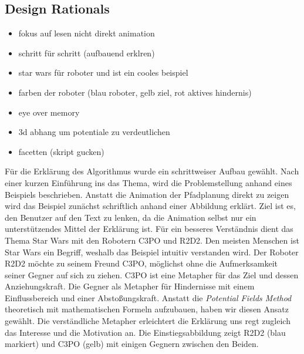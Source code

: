 \subsection{Design Rationals}
\begin{itemize}
\item fokus auf lesen nicht direkt animation
\item schritt für schritt (aufbauend erklren)
\item star wars für roboter und ist ein cooles beispiel
\item farben der roboter (blau roboter, gelb ziel, rot aktives hindernis)
\item eye over memory
\item 3d abhang um potentiale zu verdeutlichen
\item facetten (skript gucken)
\end{itemize}
Für die Erklärung des Algorithmus wurde ein schrittweiser Aufbau gewählt. Nach einer kurzen Einführung ins das Thema, wird die Problemstellung anhand eines Beispiels beschrieben. Anstatt die Animation der Pfadplanung direkt zu zeigen wird das Beispiel zunächst schriftlich anhand einer Abbildung erklärt. Ziel ist es, den Benutzer auf den Text zu lenken, da die Animation selbst nur ein unterstützendes Mittel der Erklärung ist.
Für ein besseres Verständnis dient das Thema Star Wars mit den Robotern C3PO und R2D2. Den meisten Menschen ist Star Wars ein Begriff, weshalb das Beispiel intuitiv verstanden wird. Der Roboter R2D2 möchte zu seinem Freund C3PO, möglichst ohne die Aufmerksamkeit seiner Gegner auf sich zu ziehen.
C3PO ist eine Metapher für das Ziel und dessen Anziehungskraft. Die Gegner als Metapher für Hindernisse mit einem Einflussbereich und einer Abstoßungskraft.
Anstatt die \textit{Potential Fields Method} theoretisch mit mathematischen Formeln aufzubauen, haben wir diesen Ansatz gewählt. Die verständliche Metapher erleichtert die Erklärung uns regt zugleich das Interesse und die Motivation an.
Die Einstiegsabbildung zeigt R2D2 (blau markiert) und C3PO (gelb) mit einigen Gegnern zwischen den Beiden.

